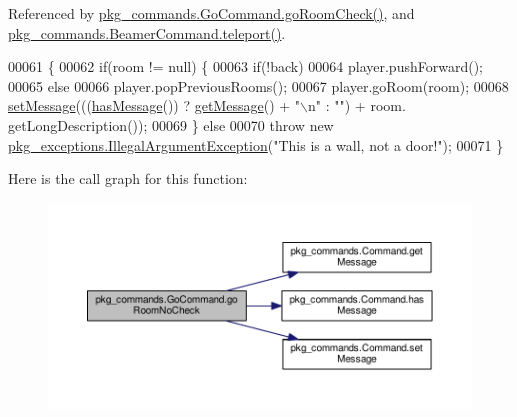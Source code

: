 Referenced by \hyperlink{GoCommand_8java_source_l00046}{pkg\-\_\-commands.\-Go\-Command.\-go\-Room\-Check()}, and \hyperlink{BeamerCommand_8java_source_l00050}{pkg\-\_\-commands.\-Beamer\-Command.\-teleport()}.


\begin{DoxyCode}
00061                                                                                                            
                   \{
00062         \textcolor{keywordflow}{if}(room != null) \{
00063             \textcolor{keywordflow}{if}(!back)
00064                 player.pushForward();
00065             \textcolor{keywordflow}{else}
00066                 player.popPreviousRooms();
00067             player.goRoom(room);
00068             \hyperlink{classpkg__commands_1_1Command_ae210ff216fe908b111ba1c988a963d13}{setMessage}(((\hyperlink{classpkg__commands_1_1Command_ae46bb048d0fa705a5037a5204b530da2}{hasMessage}()) ? \hyperlink{classpkg__commands_1_1Command_ac2a42e2bab264821892daefaf9a18b6c}{getMessage}() + \textcolor{stringliteral}{"\(\backslash\)n"} : \textcolor{stringliteral}{""}) + room.
      getLongDescription());
00069         \} \textcolor{keywordflow}{else}
00070             \textcolor{keywordflow}{throw} \textcolor{keyword}{new} \hyperlink{classpkg__exceptions_1_1IllegalArgumentException}{pkg\_exceptions.IllegalArgumentException}(\textcolor{stringliteral}{"This
       is a wall, not a door!"});
00071     \}
\end{DoxyCode}


Here is the call graph for this function\-:\nopagebreak
\begin{figure}[H]
\begin{center}
\leavevmode
\includegraphics[width=350pt]{classpkg__commands_1_1GoCommand_a210afbc5f3ef34d3ad5759d853c8f8c2_cgraph}
\end{center}
\end{figure}




